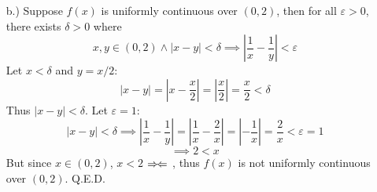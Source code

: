 \documentclass[12pt]{article}
\newcommand{\contradiction}{
    \ensuremath{{\Rightarrow\mspace{-2mu}\Leftarrow}}
}
\newcommand{\vertb}[1]{\left\vert#1\right\vert}
\newcommand{\e}{\varepsilon}
\begin{document}
\begin{itemize}
\begin{itemize}
        \pagebreak
        \item [b.)] Suppose $f(x)$ is uniformly continuous over $(0,2)$, then for all $\e>0$, there exists $\delta>0$ where
        \[x,y\in(0,2)\land\vertb{x-y}<\delta\implies\vertb{\frac{1}{x}-\frac{1}{y}}<\e\]
        Let $x<\delta$ and $y=x/2$:
        \[\vertb{x-y}=\vertb{x-\frac{x}{2}}=\vertb{\frac{x}{2}}=\frac{x}{2}<\delta\]
        Thus $\vertb{x-y}<\delta$. Let $\e=1$:
        \[\vertb{x-y}<\delta\implies\vertb{\frac{1}{x}-\frac{1}{y}}=\vertb{\frac{1}{x}-\frac{2}{x}}=\vertb{-\frac{1}{x}}=\frac{2}{x}<\e=1\]
        \[\implies2<x\]
        But since $x\in(0,2)$, $x<2$\contradiction, thus $f(x)$ is not uniformly continuous over $(0,2)$. Q.E.D.
     \end{itemize}

\end{itemize}
\end{document}
